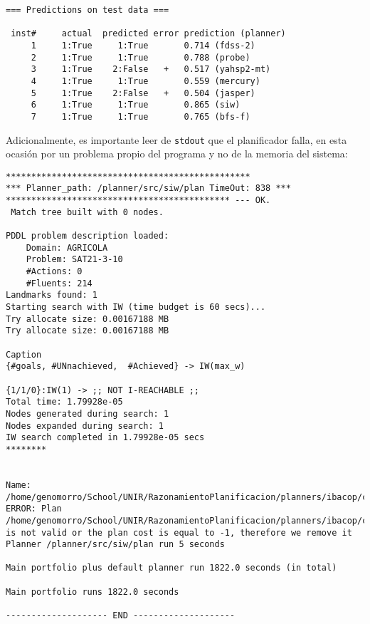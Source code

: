 \documentclass[a4paper,12pt,twocolumn]{article}
\begin{document}
\begin{lstlisting}
=== Predictions on test data ===

 inst#     actual  predicted error prediction (planner)
     1     1:True     1:True       0.714 (fdss-2)
     2     1:True     1:True       0.788 (probe)
     3     1:True    2:False   +   0.517 (yahsp2-mt)
     4     1:True     1:True       0.559 (mercury)
     5     1:True    2:False   +   0.504 (jasper)
     6     1:True     1:True       0.865 (siw)
     7     1:True     1:True       0.765 (bfs-f)
\end{lstlisting}


Adicionalmente, es importante leer de \texttt{stdout} que el planificador falla, en esta ocasión por un problema propio del programa y no de la memoria del sistema:

\begin{lstlisting}[style=consola]
************************************************
*** Planner_path: /planner/src/siw/plan TimeOut: 838 ***
******************************************** --- OK.
 Match tree built with 0 nodes.

PDDL problem description loaded: 
	Domain: AGRICOLA
	Problem: SAT21-3-10
	#Actions: 0
	#Fluents: 214
Landmarks found: 1
Starting search with IW (time budget is 60 secs)...
Try allocate size: 0.00167188 MB
Try allocate size: 0.00167188 MB

Caption
{#goals, #UNnachieved,  #Achieved} -> IW(max_w)

{1/1/0}:IW(1) -> ;; NOT I-REACHABLE ;;
Total time: 1.79928e-05
Nodes generated during search: 1
Nodes expanded during search: 1
IW search completed in 1.79928e-05 secs
********


Name: /home/genomorro/School/UNIR/RazonamientoPlanificacion/planners/ibacop/cleaned_result.result
ERROR: Plan /home/genomorro/School/UNIR/RazonamientoPlanificacion/planners/ibacop/cleaned_result.result is not valid or the plan cost is equal to -1, therefore we remove it
Planner /planner/src/siw/plan run 5 seconds

Main portfolio plus default planner run 1822.0 seconds (in total)

Main portfolio runs 1822.0 seconds

-------------------- END --------------------
\end{lstlisting}
\end{document}
